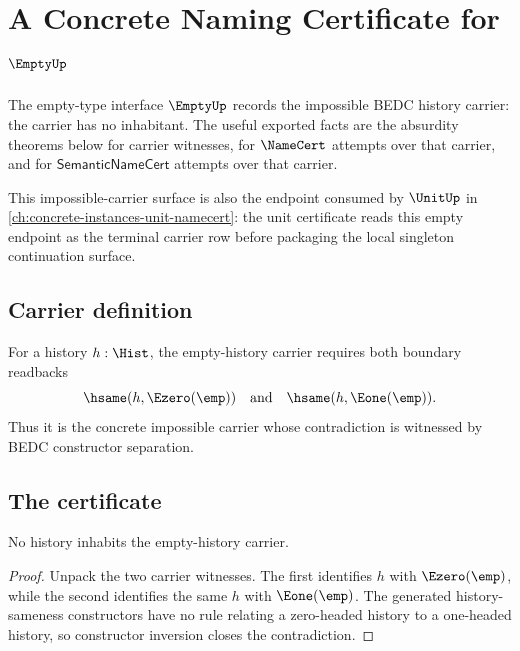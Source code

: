 \chapter{A Concrete Naming Certificate for $\EmptyUp$}
\label{ch:concrete-instances-empty-namecert}

The empty-type interface $\EmptyUp$ records the impossible BEDC history carrier:
the carrier has no inhabitant. The useful exported facts are the absurdity
theorems below for carrier witnesses, for $\NameCert$ attempts over that
carrier, and for $\mathsf{SemanticNameCert}$ attempts over that carrier.

This impossible-carrier surface is also the endpoint consumed by $\UnitUp$ in
\autoref{ch:concrete-instances-unit-namecert}: the unit certificate reads this
empty endpoint as the terminal carrier row before packaging the local singleton
continuation surface.

\section{Carrier definition}
\label{sec:empty-carrier}

\begin{definition}
\label{def:empty-history-carrier}
For a history $h:\Hist$, the empty-history carrier requires both boundary
readbacks
$$
\hsame(h,\Ezero(\emp)) \quad\text{and}\quad \hsame(h,\Eone(\emp)).
$$
Thus it is the concrete impossible carrier whose contradiction is witnessed by
BEDC constructor separation.
\end{definition}

\section{The certificate}
\label{sec:empty-certificate}

\begin{theorem}
\label{thm:empty-history-carrier-absurd}
No history inhabits the empty-history carrier.
\end{theorem}
\begin{proof}
Unpack the two carrier witnesses. The first identifies $h$ with
$\Ezero(\emp)$, while the second identifies the same $h$ with $\Eone(\emp)$.
The generated history-sameness constructors have no rule relating a zero-headed
history to a one-headed history, so constructor inversion closes the
contradiction.
\end{proof}

